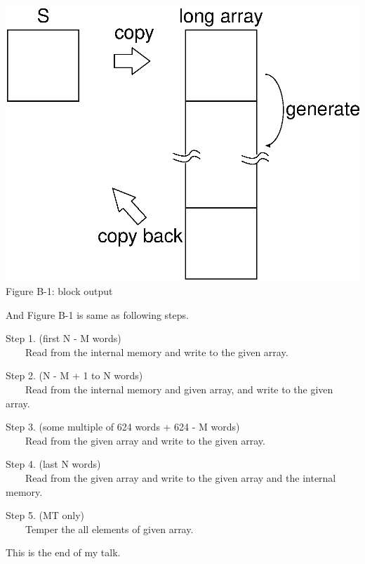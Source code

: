 \documentclass[a4j,12pt,landscape]{jarticle}
\begin{document}
\begin{center}
\includegraphics[width=0.7\linewidth,height=0.7\textheight,
keepaspectratio]{fill_array.eps}
\\
Figure B-1: block output
\end{center}
\newpage
And Figure B-1 is same as following steps.

Step 1. (first N - M words) \\
~~~~Read from the internal memory and write to the given array.

Step 2. (N - M + 1 to N words) \\
~~~~Read from the internal memory and given array, and 
write to the given array.

Step 3. (some multiple of 624 words + 624 - M words)\\
~~~~Read from the given array and write to the given array.

Step 4. (last N words)\\
~~~~Read from the given array and write to the given array and
 the internal memory.

Step 5. (MT only)\\
~~~~Temper the all elements of given array. 

\vskip 1cm
\begin{center}
This is the end of my talk.
\end{center}
\end{document}
